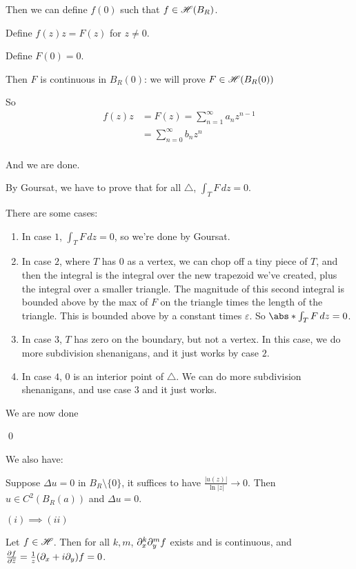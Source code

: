 \documentclass[x11names,reqno,14pt]{extarticle}
\newcommand{\oo}{{\infty}}
\begin{document}
Then we can define $f(0)$ such that $f \in \mathscr{H}(B_R)$. 

\proof

Define $f(z)z = F(z)$ for $z \neq 0$. 

Define $F(0) = 0$.

Then $F$ is continuous in $B_R(0)$: we will prove $F \in \mathscr{H}(B_R(0))$

So
\begin{align*}
f(z)z & = F(z) = \sum_{n=1}^\oo a_nz^{n - 1} \\
		& = \sum_{n=0}^\oo b_nz^n \\
\end{align*}

And we are done. 

By Goursat, we have to prove that for all $\bigtriangleup$, $\int_TF\,dz = 0$. 

There are some cases:
\begin{enumerate}
\item In case $1$, $\int_TF\,dz = 0$, so we're done by Goursat. 
\item In case $2$, where $T$ has 0 as a vertex, we can chop off a tiny piece of $T$, and then the integral is the integral over the new trapezoid we've created, plus the integral over a smaller triangle. The magnitude of this second integral is bounded above by the max of $F$ on the triangle times the length of the triangle. This is bounded above by a constant times $\varepsilon$.  So $\abs*{\int_TF\,dz} = 0$.
\item In case $3$, $T$ has zero on the boundary, but not a vertex. In this case, we do more subdivision shenanigans, and it just works by case $2$. 
\item In case $4$, 0 is an interior point of $\bigtriangleup$. We can do more subdivision shenanigans, and use case $3$ and it just works. 
\end{enumerate}

We are now done

\qed

We also have:

Suppose $\Delta u = 0$ in $B_R\setminus\{0\}$, it suffices to have $\frac{|u(z)|}{\ln|z|}\to 0$. Then $u \in C^2(B_R(a))$ and $\Delta u = 0$. 

\thm $(i)\implies (ii)$

Let $f \in \mathscr{H}$. Then for all $k, m$, $\partial_x^k\partial_y^mf$ exists and is continuous, and $\frac{\partial f}{\partial \overline{z}} = \frac{1}{z}(\partial_x + i\partial_y)f = 0$. 
\end{document}
